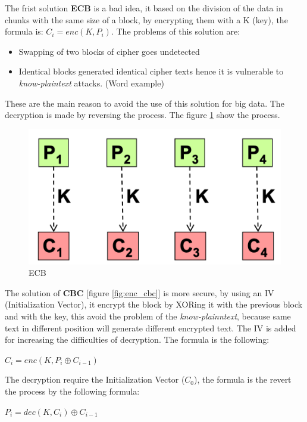 \documentclass[12pt]{article}
\begin{document}
The frist solution \textbf{ECB} is a bad idea, it based on the division of the data in chunks with the same size of a block, by encrypting them with a K (key), the formula is: $C_i = enc(K, P_i)$. The problems of this solution are:
\begin{itemize}
  \item Swapping of two blocks of cipher goes undetected
  \item Identical blocks generated identical cipher texts hence it is vulnerable to \textit{know-plaintext} attacks. (Word example)
\end{itemize}
These are the main reason to avoid the use of this solution for big data. The decryption is made by reversing the process. The figure \ref{fig:ecb} show the process.
\begin{figure}[H]
  \includegraphics[width=\linewidth]{images/ecb.png}
  \caption{ECB}
  \label{fig:ecb}
\end{figure}
The solution of \textbf{CBC} [figure \ref{fig:enc_cbc}] is more secure, by using an IV (Initialization Vector), it encrypt the block by XORing it with the previous block and with the key, this avoid the problem of the \textit{know-plainntext}, because same text in different position will generate different encrypted text. The IV is added for increasing the difficulties of decryption. The formula is the following:
\begin{center}
  $C_i = enc(K, P_i \oplus C_{i-1})$
\end{center}
The decryption require the Initialization Vector ($C_{0}$), the formula is the revert the process by the following formula:
\begin{center}
  $P_i = dec(K, C_i) \oplus C_{i-1}$
\end{center}
\end{document}
